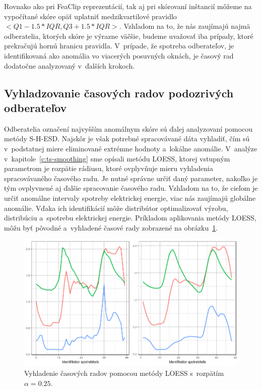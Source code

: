 \documentclass[a4paper,twoside,slovak,12pt,appendix]{article}
\begin{document}
\noindent
Rovnako ako pri FeaClip reprezentácií, tak aj pri skórovaní inštancií môžeme na
vypočítané skóre opäť uplatniť medzikvartilové pravidlo $<Q1 - 1.5 *
IQR, Q3 + 1.5 * IQR>$. Vzhľadom na to, že nás zaujímajú najmä odberatelia,
ktorých skóre je výrazne väčšie, budeme uvažovať iba prípady, ktoré prekračujú
hornú hranicu pravidla. V~prípade, že spotreba odberateľov, je identifikovaná
ako anomália vo viacerých posuvných oknách, je časový rad dodatočne analyzovaný
v~ďalších krokoch.

\subsection{Vyhladzovanie časových radov podozrivých odberateľov}
Odberatelia označení najvyšším anomálnym skóre sú ďalej analyzovaní pomocou
metódy S-H-ESD. Najskôr je však potrebné spracovávané dáta vyhladiť, čím sú
v~podstatnej miere eliminované extrémne hodnoty a~lokálne anomálie. V~analýze
v~kapitole~\ref{c:ts-smoothing} sme opísali metódu LOESS, ktorej vstupným
parametrom je rozpätie rádiusu, ktoré ovplyvňuje mieru vyhladenia
spracovávaného časového radu. Je nutné správne určiť daný parameter, nakoľko
je tým ovplyvnené aj ďalšie spracovanie časového radu. Vzhľadom na to, že cieľom
je určiť anomálne intervaly spotreby elektrickej energie, viac nás zaujímajú
globálne anomálie. Vďaka ich identifikácií môže distribútor optimalizovať
výrobu, distribúciu a~spotrebu elektrickej energie. Príkladom aplikovania metódy
LOESS, môžu byť pôvodné a~vyhladené časové rady zobrazené na
obrázku~\ref{fig:smoothing-example}.

\begin{figure}[htbp]
  \centering
  \includegraphics[width=\textwidth]{smoothing_example.png}
  \caption[Vyhladenie časových radov pomocou metódy LOESS.]{Vyhladenie časových radov pomocou metódy LOESS s~rozpätím $\alpha=0.25$.}
  \label{fig:smoothing-example}
\end{figure}
\end{document}
